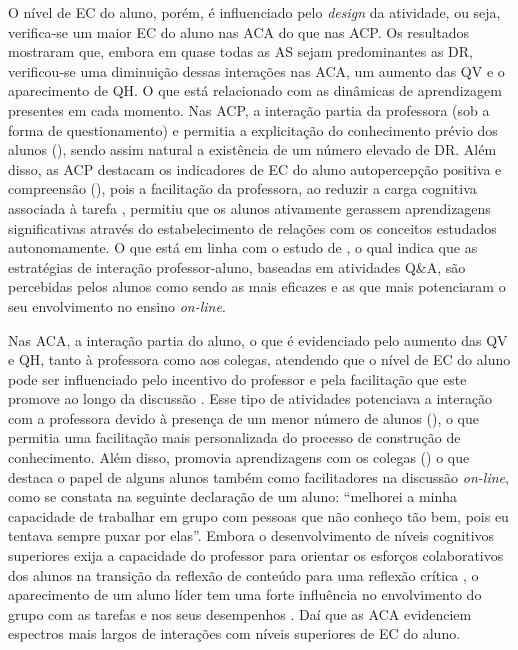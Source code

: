 \documentclass[portuguese]{textolivre}
\begin{document}
O nível de EC do aluno, porém, é influenciado pelo \textit{design} da atividade, ou seja, verifica-se um maior EC do aluno nas ACA do que nas ACP. Os resultados mostraram que, embora em quase todas as AS sejam predominantes as DR, verificou-se uma diminuição dessas interações nas ACA, um aumento das QV e o aparecimento de QH. O que está relacionado com as dinâmicas de aprendizagem presentes em cada momento. Nas ACP, a interação partia da professora (sob a forma de questionamento) e permitia a explicitação do conhecimento prévio dos alunos (), sendo assim natural a existência de um número elevado de DR. Além disso, as ACP destacam os indicadores de EC do aluno autopercepção positiva e compreensão (), pois a facilitação da professora, ao reduzir a carga cognitiva associada à tarefa \cite{kirschner_why_2006}, permitiu que os alunos ativamente gerassem aprendizagens significativas através do estabelecimento de relações com os conceitos estudados autonomamente. O que está em linha com o estudo de \textcite{abou-khalil_emergency_2021}, o qual indica que as estratégias de interação professor-aluno, baseadas em atividades Q\&A, são percebidas pelos alunos como sendo as mais eficazes e as que mais potenciaram o seu envolvimento no ensino \textit{on-line}. 

Nas ACA, a interação partia do aluno, o que é evidenciado pelo aumento das QV e QH, tanto à professora como aos colegas, atendendo que o nível de EC do aluno pode ser influenciado pelo incentivo do professor e pela facilitação que este promove ao longo da discussão \cite{zhu_interaction_2006}. Esse tipo de atividades potenciava a interação com a professora devido à presença de um menor número de alunos (), o que permitia uma facilitação mais personalizada do processo de construção de conhecimento. Além disso, promovia aprendizagens com os colegas () o que destaca o papel de alguns alunos também como facilitadores na discussão \textit{on-line}, como se constata na seguinte declaração de um aluno: “melhorei a minha capacidade de trabalhar em grupo com pessoas que não conheço tão bem, pois eu tentava sempre puxar por elas”. Embora o desenvolvimento de níveis cognitivos superiores exija a capacidade do professor para orientar os esforços colaborativos dos alunos na transição da reflexão de conteúdo para uma reflexão crítica \cite{carrillo_covid-19_2020}, o aparecimento de um aluno líder tem uma forte influência no envolvimento do grupo com as tarefas e nos seus desempenhos \cite{xu_effects_2020}. Daí que as ACA evidenciem espectros mais largos de interações com níveis superiores de EC do aluno.  
\end{document}
